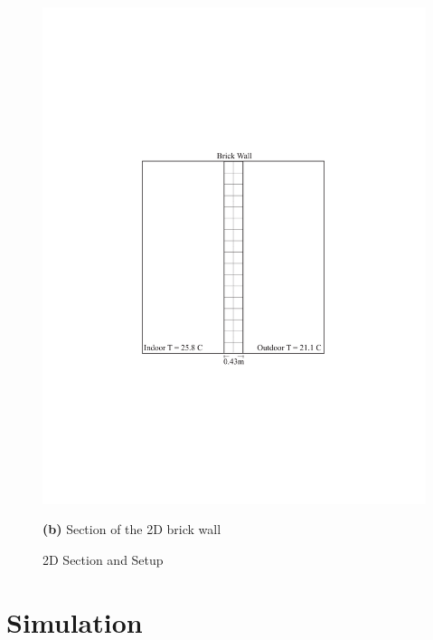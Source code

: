 \begin{figure}[tbh]
\begin{minipage}{0.47\textwidth}
  \includegraphics[trim=5.6cm 7.5cm 5.3cm 8cm, clip, width=.95\linewidth]{Figures/2dsection1.pdf}
  \caption*{\textbf{(b)} Section of the 2D brick wall}
\end{minipage}
\caption{2D Section and Setup}
\label{fig:2d2}
\end{figure}





















\section{Simulation}


